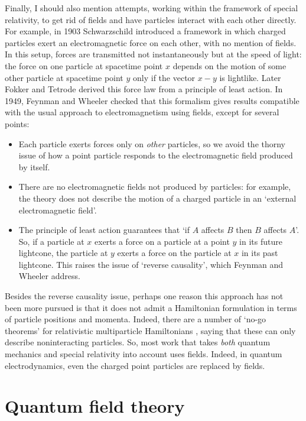 \documentclass{article}
\begin{document}
Finally, I should also mention attempts, working within the framework of special relativity, to get rid of fields and have particles interact with each other directly.  For example, in 1903 Schwarzschild \cite{Schwarzschild} introduced a framework in which charged particles exert an electromagnetic force on each other, with no mention of fields.  In this setup, forces are transmitted not instantaneously but at the speed of light: the force on one particle at spacetime point $x$ depends on the motion of some other particle at spacetime point $y$ only if the vector $x - y$ is lightlike.  Later Fokker and Tetrode \cite{Fokker,Tetrode} derived this force law from a principle of least action.  In 1949, Feynman and Wheeler checked that this formalism gives results compatible with the usual approach to electromagnetism using fields, except for several points:
\begin{itemize}
\item Each particle exerts forces only on \emph{other} particles, so we avoid the thorny issue of how a point particle responds to the electromagnetic field produced by itself.
\item There are no electromagnetic fields not produced by particles: for example, the theory does not describe the motion of a charged particle in an `external electromagnetic
field'.
\item The principle of least action guarantees that `if $A$ affects $B$ then $B$ affects
$A$'.  So, if a particle at $x$ exerts a force on a particle at a point $y$ in its future lightcone, the particle at $y$ exerts a force on the particle at $x$ in its past lightcone.  This raises the issue of `reverse causality', which Feynman and Wheeler address.
\end{itemize}
Besides the reverse causality issue, perhaps one reason this approach has 
not been more pursued is that it does not admit a Hamiltonian formulation in terms
of particle positions and momenta.  Indeed, there are a number of `no-go theorems' for relativistic multiparticle Hamiltonians \cite{CJS,Leutwyler}, saying that these can only 
describe noninteracting particles.   So, most work that takes \emph{both} quantum mechanics and special relativity into account uses fields.  Indeed, in quantum electrodynamics, even the charged point particles are replaced by fields.

\section{Quantum field theory}
\label{qft}
\end{document}
